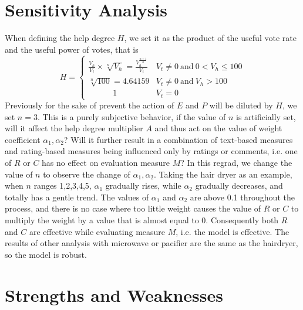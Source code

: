 \documentclass{mcmthesis}
\begin{document}
\section{Sensitivity Analysis}
When defining the help degree $ H $, we set it as the product of the useful vote rate and the useful power of votes, that is 
\begin{equation}
H=\left\{ \begin{array}{ll} 	\frac{V_h}{V_t}\times \sqrt[n]{V_h}=\frac{V_{h}^{\frac{n+1}{n}}}{V_t} & V_t\ne 0 \ \text{and} \ 0<V_h\le 100\\ 	\sqrt[n]{100}=4.64159 & V_t\ne 0 \ \text{and} \ V_h>100\\ \qquad\quad 1 & V_t=0 \end{array} \right.
\end{equation}
Previously for the sake of prevent the action of $ E $ and $ P $ will be diluted by $ H $, we set $ n=3 $. This is a purely subjective behavior, if the value of $ n $ is artificially set, will it affect the help degree multiplier $ A $ and thus act on the value of weight coefficient $ \alpha _1,\alpha _2 $? Will it further result in a combination of text-based measures and rating-based measures being influenced only by ratings or comments, i.e. one of $ R $ or $ C $ has no effect on evaluation measure $ M $? In this regrad, we change the value of $ n $ to observe the change of $ \alpha _1,\alpha _2 $.
Taking the hair dryer as an example, when $ n $ ranges 1,2,3,4,5, $\alpha_1$ gradually rises, while $\alpha_2$ gradually decreases, and totally has a gentle trend. The values of $\alpha_1$ and $\alpha_2$ are above 0.1 throughout the process, and there is no case where too little weight causes the value of $R$ or $C$ to multiply the weight by a value that is almost equal to 0. Consequently both $R$ and $C$ are effective while evaluating measure $ M $, i.e. the model is effective. The results of other analysis with microwave or pacifier are the same as the hairdryer, so the model is robust.

\section{Strengths and Weaknesses}
\end{document}
